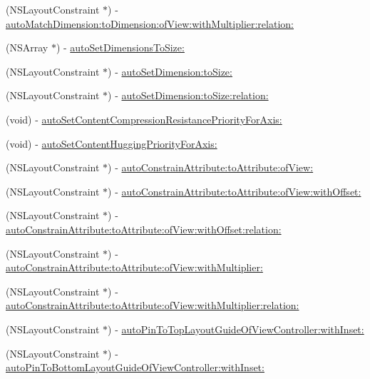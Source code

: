 \begin{DoxyCompactItemize}
(N\+S\+Layout\+Constraint $\ast$) -\/ \mbox{\hyperlink{category_u_i_view_07_auto_layout_08_a7590ab20728c03c6be8cb72a836bd468}{auto\+Match\+Dimension\+:to\+Dimension\+:of\+View\+:with\+Multiplier\+:relation\+:}}
\item 
(N\+S\+Array $\ast$) -\/ \mbox{\hyperlink{category_u_i_view_07_auto_layout_08_a32c0dae1041ec6d5cd66ae8587008a71}{auto\+Set\+Dimensions\+To\+Size\+:}}
\item 
(N\+S\+Layout\+Constraint $\ast$) -\/ \mbox{\hyperlink{category_u_i_view_07_auto_layout_08_a75d72195d3afa144a1ee06dce72567be}{auto\+Set\+Dimension\+:to\+Size\+:}}
\item 
(N\+S\+Layout\+Constraint $\ast$) -\/ \mbox{\hyperlink{category_u_i_view_07_auto_layout_08_a2c6564d02b76d4aa21ed349dbc912b7c}{auto\+Set\+Dimension\+:to\+Size\+:relation\+:}}
\item 
(void) -\/ \mbox{\hyperlink{category_u_i_view_07_auto_layout_08_ada65b7dbf7477a964be23132ab10759e}{auto\+Set\+Content\+Compression\+Resistance\+Priority\+For\+Axis\+:}}
\item 
(void) -\/ \mbox{\hyperlink{category_u_i_view_07_auto_layout_08_ac41c8271f622bd4b9e5fda8338679632}{auto\+Set\+Content\+Hugging\+Priority\+For\+Axis\+:}}
\item 
(N\+S\+Layout\+Constraint $\ast$) -\/ \mbox{\hyperlink{category_u_i_view_07_auto_layout_08_abee5e0d9288ccd4bd6ee0a7d3638f71f}{auto\+Constrain\+Attribute\+:to\+Attribute\+:of\+View\+:}}
\item 
(N\+S\+Layout\+Constraint $\ast$) -\/ \mbox{\hyperlink{category_u_i_view_07_auto_layout_08_a10598689d1cb3c8f68e20aeaf619f53b}{auto\+Constrain\+Attribute\+:to\+Attribute\+:of\+View\+:with\+Offset\+:}}
\item 
(N\+S\+Layout\+Constraint $\ast$) -\/ \mbox{\hyperlink{category_u_i_view_07_auto_layout_08_adbd0420fa2b1159a7243e93567d85864}{auto\+Constrain\+Attribute\+:to\+Attribute\+:of\+View\+:with\+Offset\+:relation\+:}}
\item 
(N\+S\+Layout\+Constraint $\ast$) -\/ \mbox{\hyperlink{category_u_i_view_07_auto_layout_08_ab05009d39cf6e74d38b9d102ce6bc06e}{auto\+Constrain\+Attribute\+:to\+Attribute\+:of\+View\+:with\+Multiplier\+:}}
\item 
(N\+S\+Layout\+Constraint $\ast$) -\/ \mbox{\hyperlink{category_u_i_view_07_auto_layout_08_ab37c44a35fdae790f69e6dfe89b0bf63}{auto\+Constrain\+Attribute\+:to\+Attribute\+:of\+View\+:with\+Multiplier\+:relation\+:}}
\item 
(N\+S\+Layout\+Constraint $\ast$) -\/ \mbox{\hyperlink{category_u_i_view_07_auto_layout_08_ae8ec00a47cf956cb9a74b86f16802788}{auto\+Pin\+To\+Top\+Layout\+Guide\+Of\+View\+Controller\+:with\+Inset\+:}}
\item 
(N\+S\+Layout\+Constraint $\ast$) -\/ \mbox{\hyperlink{category_u_i_view_07_auto_layout_08_afa0d7eb33a16b617bc4efd41d89a68ec}{auto\+Pin\+To\+Bottom\+Layout\+Guide\+Of\+View\+Controller\+:with\+Inset\+:}}
\end{DoxyCompactItemize}
